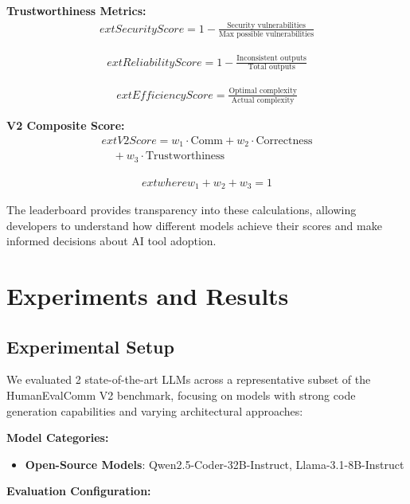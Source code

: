 \documentclass[conference]{IEEEtran}
\begin{document}
\textbf{Trustworthiness Metrics:}
\begin{align}
	ext{Security Score} = 1 - \frac{\text{Security vulnerabilities}}{\text{Max possible vulnerabilities}}
\end{align}

\begin{align}
	ext{Reliability Score} = 1 - \frac{\text{Inconsistent outputs}}{\text{Total outputs}}
\end{align}

\begin{align}
	ext{Efficiency Score} = \frac{\text{Optimal complexity}}{\text{Actual complexity}}
\end{align}

\textbf{V2 Composite Score:}
\begin{multline}
	ext{V2 Score} = w_1 \cdot \text{Comm} + w_2 \cdot \text{Correctness} \\
\quad + w_3 \cdot \text{Trustworthiness}
\end{multline}

\begin{align}
	ext{where } w_1 + w_2 + w_3 = 1
\end{align}

The leaderboard provides transparency into these calculations, allowing developers to understand how different models achieve their scores and make informed decisions about AI tool adoption.

\section{Experiments and Results}

\subsection{Experimental Setup}

We evaluated 2 state-of-the-art LLMs across a representative subset of the HumanEvalComm V2 benchmark, focusing on models with strong code generation capabilities and varying architectural approaches:

\textbf{Model Categories:}

\begin{itemize}
    \item \textbf{Open-Source Models}: Qwen2.5-Coder-32B-Instruct, Llama-3.1-8B-Instruct
\end{itemize}

\textbf{Evaluation Configuration:}
\end{document}

